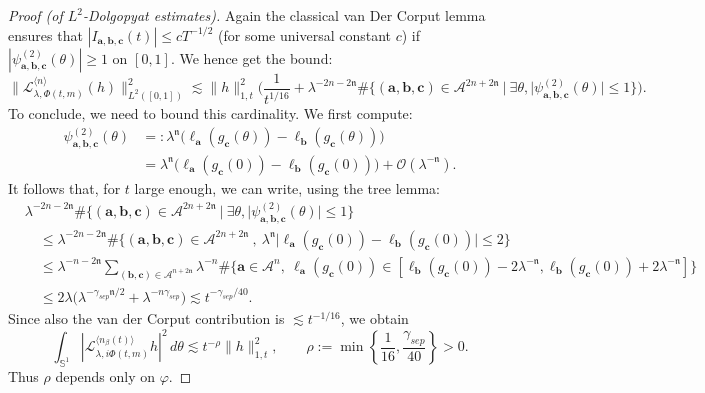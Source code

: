 \documentclass[11pt]{amsart}
\theoremstyle{plain}
\theoremstyle{definition}
\numberwithin{equation}{section}
\begin{document}
\begin{proof}[Proof (of $L^2$-Dolgopyat estimates)]
Again the classical van Der Corput lemma ensures that $|I_{\mathbf{a},\mathbf{b},\mathbf{c}}(t)| \leq c T^{-1/2}$ (for some universal constant $c$) if $|\psi_{\mathbf{a},\mathbf{b},\mathbf{c}}^{(2)}(\theta)| \geq 1$ on $[0,1]$. We hence get the bound:
$$ \Big\| \mathcal{L}_{\lambda,\Phi(t,m)}^{\langle n \rangle}(h) \Big\|_{L^2([0,1])}^2 \lesssim \|h\|_{1,t}^2 \Big( \frac{1}{t^{1/16}} + \lambda^{-2n-2\mathfrak{n}} \#\{ (\mathbf{a},\mathbf{b},\mathbf{c}) \in \mathcal{A}^{2n+2\mathfrak{n}} \ | \ \exists \theta, |\psi_{\mathbf{a},\mathbf{b},\mathbf{c}}^{(2)}(\theta)| \leq 1\} \Big). $$
To conclude, we need to bound this cardinality. We first compute:
\begin{align*}
\psi_{\mathbf{a},\mathbf{b},\mathbf{c}}^{(2)}(\theta) &=: \lambda^{\mathfrak{n}} \big( \ell_{\mathbf{a}}(g_\mathbf{c}(\theta)) - \ell_{\mathbf{b}}(g_\mathbf{c}(\theta)) \big)  \\
& = \lambda^{\mathfrak{n}} \big( \ell_{\mathbf{a}}(g_\mathbf{c}(0)) - \ell_{\mathbf{b}}(g_\mathbf{c}(0)) \big) + \mathcal{O}(\lambda^{-\mathfrak{n}}) .
\end{align*}
It follows that, for $t$ large enough, we can write, using the tree lemma:
\begin{align*}
& \lambda^{-2n-2\mathfrak{n}} \#\{ (\mathbf{a},\mathbf{b},\mathbf{c}) \in \mathcal{A}^{2n+2\mathfrak{n}} \ | \ \exists \theta, |\psi_{\mathbf{a},\mathbf{b},\mathbf{c}}^{(2)}(\theta)| \leq 1\}\\
&\quad \leq \lambda^{-2n-2\mathfrak{n}} \#\{ (\mathbf{a},\mathbf{b},\mathbf{c}) \in \mathcal{A}^{2n+2\mathfrak{n}} \ , \ \lambda^{\mathfrak{n}} \big| \ell_{\mathbf{a}}(g_\mathbf{c}(0)) - \ell_{\mathbf{b}}(g_\mathbf{c}(0)) \big| \leq 2\} \\
&\quad \leq \lambda^{-n-2\mathfrak{n}} \sum_{(\mathbf{b},\mathbf{c}) \in \mathcal{A}^{n+2\mathfrak{n}}} \lambda^{-n} \#\{ \mathbf{a} \in \mathcal{A}^n, \ \ell_\mathbf{a}(g_\mathbf{c}(0)) \in [\ell_\mathbf{b}(g_\mathbf{c}(0))-2\lambda^{-\mathfrak{n}},\ell_\mathbf{b}(g_\mathbf{c}(0))+2\lambda^{-\mathfrak{n}} ] \} \\
&\quad \leq 2 \lambda \Big( \lambda^{- \gamma_{sep} \mathfrak{n}/2} + \lambda^{-n \gamma_{sep}} \Big) \lesssim t^{-\gamma_{sep}/40}.
\end{align*}
Since also the van der Corput contribution is $\lesssim t^{-1/16}$, we obtain
$$
\int_{\mathbb S^1}
\left|\mathcal L_{\lambda,i\Phi(t,m)}^{\langle n_\beta(t)\rangle}h\right|^2\,d\theta
\lesssim
t^{-\rho}\|h\|_{1,t}^2,
\qquad
\rho:=\min\left\{\frac1{16},\frac{\gamma_{sep}}{40}\right\}>0.
$$
Thus $\rho$ depends only on $\varphi$.
\end{proof}
\end{document}
